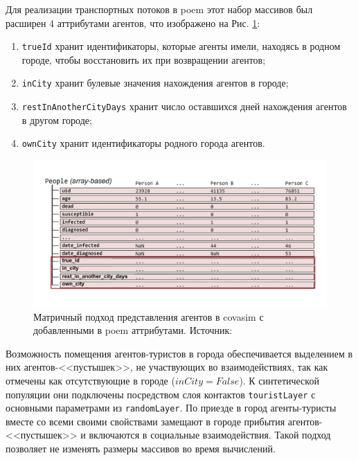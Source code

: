 \documentclass[a4paper,12pt]{article} %
\begin{document}
Для реализации транспортных потоков в \gls{poem} этот набор массивов был расширен 4 аттрибутами агентов, что изображено на Рис. \ref{pic:array}:
\begin{enumerate}
\item \texttt{trueId} хранит идентификаторы, которые агенты имели, находясь в родном городе, чтобы восстановить их при возвращении агентов;
\item \texttt{inCity} хранит булевые значения нахождения агентов в городе;
\item \texttt{restInAnotherCityDays} хранит число оставшихся дней нахождения агентов в другом городе;
\item \texttt{ownCity} хранит идентификаторы родного города агентов.
\end{enumerate}

\begin{figure}[]
    \centering
    \includegraphics[width=\linewidth]{images/arrays.pdf}
    \caption{Матричный подход представления агентов в \gls{covasim} с добавленными в \gls{poem} аттрибутами. Источник: \cite{kerr2021covasim}}
    \label{pic:array}
\end{figure}

Возможность помещения агентов-туристов в города обеспечивается выделением в них агентов-<<пустышек>>, не участвующих во взаимодействиях, так как отмечены как отсутствующие в городе (\(inCity = False\)). К синтетической популяции они подключены посредством слоя контактов \texttt{touristLayer} с основными параметрами из \texttt{randomLayer}. По приезде в город агенты-туристы вместе со всеми своими свойствами замещают в городе прибытия агентов-<<пустышек>> и включаются в социальные взаимодействия. Такой подход позволяет не изменять размеры массивов во время вычислений.
\end{document}
